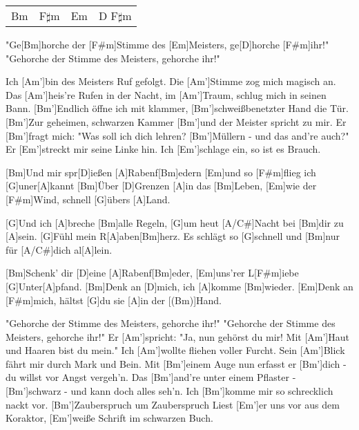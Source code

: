 



\begin{guitar}
	{\footnotesize\begin{tabular}{|l|l|l|l|}
			Bm & F$\sharp$m & Em & D F$\sharp$m
	\end{tabular} }

	"Ge[Bm]horche der [F#m]Stimme des [Em]Meisters, ge[D]horche [F#m]ihr!"
	"Gehorche der Stimme des Meisters, gehorche ihr!"
	
	Ich [Am']bin des Meisters Ruf gefolgt. Die [Am']Stimme zog mich magisch an.
	Das [Am']heis're Rufen in der Nacht, im [Am']Traum, schlug mich in seinen Bann.
	[Bm']Endlich öffne ich mit klammer, [Bm']schweißbenetzter Hand die Tür.
	[Bm']Zur geheimen, schwarzen Kammer [Bm']und der Meister spricht zu mir.
	Er [Bm']fragt mich: "Was soll ich dich lehren? [Bm']Müllern - und das and're auch?"
	Er [Em']streckt mir seine Linke hin. Ich [Em']schlage ein, so ist es Brauch.
	
	\begin{highlightbar}
		[Bm]Und mir spr[D]ießen [A]Rabenf[Bm]edern [Em]und so [F#m]flieg ich [G]uner[A]kannt
		[Bm]{Ü}ber [D]Grenzen [A]in das [Bm]Leben, [Em]wie der [F#m]Wind, schnell [G]{ü}bers [A]Land.
		
		[G]Und ich [A]breche [Bm]alle Regeln, [G]um heut [A/C#]Nacht bei [Bm]dir zu [A]sein.
		[G]Fühl mein R[A]aben[Bm]herz. Es schlägt so [G]schnell und [Bm]nur für [A/C#]dich al[A]lein.
		
		[Bm]Schenk' dir [D]eine [A]Rabenf[Bm]eder, [Em]uns'rer L[F#m]iebe [G]Unter[A]pfand.
		[Bm]Denk an [D]mich, ich [A]komme [Bm]wieder. [Em]Denk an [F#m]mich, hältst [G]du sie [A]in der [(Bm)]Hand.
	\end{highlightbar}
	
	"Gehorche der Stimme des Meisters, gehorche ihr!"
	"Gehorche der Stimme des Meisters, gehorche ihr!"
	\pagebreak
	Er [Am']spricht: "Ja, nun gehörst du mir! Mit [Am']Haut und Haaren bist du mein."
	Ich [Am']wollte fliehen voller Furcht. Sein [Am']Blick fährt mir durch Mark und Bein.
	Mit [Bm']einem Auge nun erfasst er [Bm']dich - du willst vor Angst vergeh'n.
	Das [Bm']and're unter einem Pflaster - [Bm']schwarz - und kann doch alles seh'n.
	Ich [Bm']komme mir so schrecklich nackt vor. [Bm']Zauberspruch um Zauberspruch
	Liest [Em']er uns vor aus dem Koraktor, [Em']weiße Schrift im schwarzen Buch.
	

\end{guitar}
